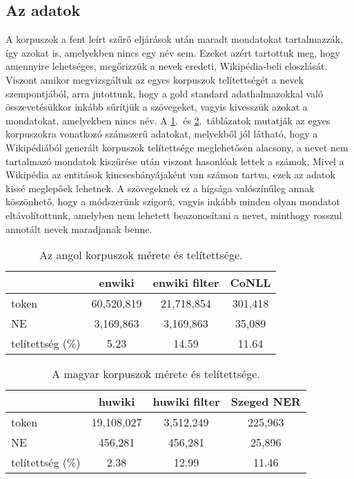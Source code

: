 \documentclass{llncs}
\begin{document}
\subsection{Az adatok}

A korpuszok a fent leírt szűrő eljárások után maradt mondatokat tartalmazzák, így azokat is, amelyekben nincs egy név sem. Ezeket azért tartottuk meg, hogy amennyire lehetséges, megőrizzük a nevek eredeti, Wikipédia-beli eloszlását. Viszont amikor megvizsgáltuk az egyes korpuszok telítettségét a nevek szempontjából, arra jutottunk, hogy a gold standard adathalmazokkal való összevetésükkor inkább sűrítjük a szövegeket, vagyis kivesszük azokat a mondatokat, amelyekben nincs név. A \ref{tab:size_en}.~és \ref{tab:size_hu}.~táblázatok mutatják az egyes korpuszokra vonatkozó számszerű adatokat, melyekből jól látható, hogy a Wikipédiából generált korpuszok telítettsége meglehetősen alacsony, a nevet nem tartalmazó mondatok kiszűrése után viszont hasonlóak lettek a számok. Mivel a Wikipédia az entitások kincsesbányájaként van számon tartva, ezek az adatok kissé meglepőek lehetnek. A szövegeknek ez a hígsága valószínűleg annak köszönhető, hogy a módszerünk szigorú, vagyis inkább minden olyan mondatot eltávolítottunk, amelyben nem lehetett beazonosítani a nevet, minthogy rosszul annotált nevek maradjanak benne. 

\begin{table}[ht]
\begin{center}
\begin{tabular}{lccc}
\toprule  
& \textbf{enwiki} & \textbf{enwiki filter} & \textbf{CoNLL} \\ 
\midrule
token & 60,520,819 & 21,718,854 & 301,418 \\
NE & 3,169,863 & 3,169,863 & 35,089 \\
telítettség (\%) & 5.23 & 14.59 & 11.64 \\
\hline
\end{tabular}
\end{center}
\caption{Az angol korpuszok mérete és telítettsége.}
\label{tab:size_en}
\end{table}
 
\begin{table}[ht]
\begin{center}
\begin{tabular}{lccc}
\toprule
 & \textbf{huwiki} & \textbf{huwiki filter} & \textbf{Szeged NER} \\
\midrule
token & 19,108,027 & 3,512,249  & 225,963 \\
NE & 456,281 & 456,281  & 25,896 \\
telítettség (\%) & 2.38 & 12.99 & 11.46 \\
\bottomrule
\end{tabular}
\end{center}
\caption{A magyar korpuszok mérete és telítettsége.}
\label{tab:size_hu}
\end{table}
\end{document}
